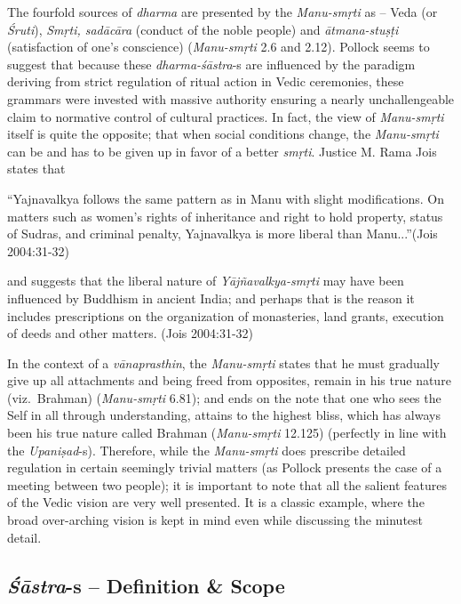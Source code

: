 The fourfold sources of {\sl dharma} are presented by the {\sl Manu-smṛti} as -- Veda (or {\sl Śruti}), {\sl Smṛti, sadācāra} (conduct of the noble people) and {\sl ātmana-stuṣṭi} (satisfaction of one's conscience) ({\sl Manu-smṛti} 2.6 and 2.12). Pollock seems to suggest that because these \hbox{{\sl dharma-śāstra}-s} are influenced by the paradigm deriving from strict regulation of ritual action in Vedic ceremonies, these grammars were invested with massive authority ensuring a nearly unchallengeable claim to normative control of cultural practices. In fact, the view of {\sl Manu-smṛti} itself is quite the opposite; that when social conditions change, the {\sl Manu-smṛti} can be and has to be given up in favor of a better {\sl smṛti}. Justice M. Rama Jois states that
\begin{myquote}
``Yajnavalkya follows the same pattern as in Manu with slight modifications. On matters such as women's rights of inheritance and right to hold property, status of Sudras, and criminal penalty, Yajnavalkya is more liberal than Manu...''\hfill (Jois 2004:31-32)
\end{myquote}
and suggests that the liberal nature of {\sl Yājñavalkya-smṛti} may have been influenced by Buddhism in ancient India; and perhaps that is the reason it includes prescriptions on the organization of monasteries, land grants, execution of deeds and other matters. (Jois 2004:31-32)

In the context of a {\sl vānaprasthin}, the {\sl Manu-smṛti} states that he must gradually give up all attachments and being freed from opposites, remain in his true nature (viz.\ Brahman) ({\sl Manu-smṛti} 6.81); and ends on the note that one who sees the Self in all through understanding, attains to the highest bliss, which has always been his true nature called Brahman ({\sl Manu-smṛti} 12.125) (perfectly in line with the {\sl Upaniṣad}-s). Therefore, while the {\sl Manu-smṛti} does prescribe detailed regulation in certain seemingly trivial matters (as Pollock presents the case of a meeting between two people); it is important to note that all the salient features of the Vedic vision are very well presented. It is a classic example, where the broad over-arching vision is kept in mind even while discussing the minutest detail.

\subsection{{{\sl\bfseries Śāstra}\relax}-s -- Definition \& Scope}\label{art12-sec3.4}

